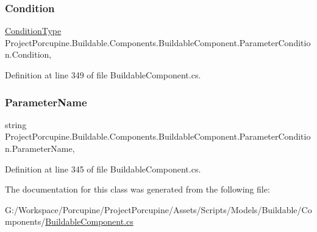 \subsubsection{\texorpdfstring{Condition}{Condition}}
{\footnotesize\ttfamily \hyperlink{class_project_porcupine_1_1_buildable_1_1_components_1_1_buildable_component_a3d88a65107c808a21df55bde70954ffc}{Condition\+Type} Project\+Porcupine.\+Buildable.\+Components.\+Buildable\+Component.\+Parameter\+Condition.\+Condition\hspace{0.3cm}{\ttfamily [get]}, {\ttfamily [set]}}



Definition at line 349 of file Buildable\+Component.\+cs.

\mbox{\label{class_project_porcupine_1_1_buildable_1_1_components_1_1_buildable_component_1_1_parameter_condition_ab86cb8f2ff5f7607dc8569b3a41d0b32}} 
\subsubsection{\texorpdfstring{Parameter\+Name}{ParameterName}}
{\footnotesize\ttfamily string Project\+Porcupine.\+Buildable.\+Components.\+Buildable\+Component.\+Parameter\+Condition.\+Parameter\+Name\hspace{0.3cm}{\ttfamily [get]}, {\ttfamily [set]}}



Definition at line 345 of file Buildable\+Component.\+cs.



The documentation for this class was generated from the following file\+:\begin{DoxyCompactItemize}
\item 
G\+:/\+Workspace/\+Porcupine/\+Project\+Porcupine/\+Assets/\+Scripts/\+Models/\+Buildable/\+Components/\hyperlink{_buildable_component_8cs}{Buildable\+Component.\+cs}\end{DoxyCompactItemize}
